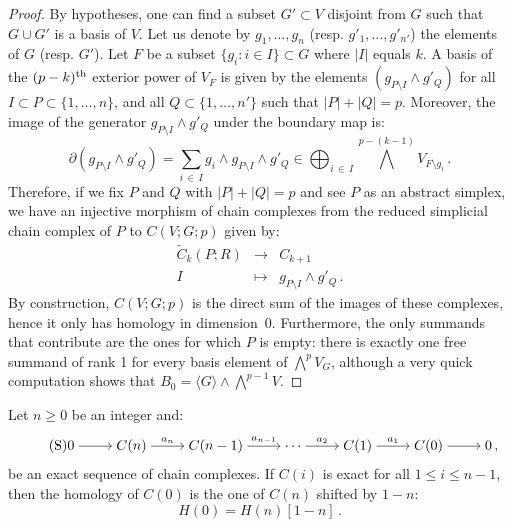 \documentclass[AHL,Unicode,longabstracts,published]{cedram}
\begin{document}
\begin{proof}
By hypotheses, one can find a subset $G'\subset V$ disjoint from $G$ such that $G\cup G'$ is a basis of $V$. Let us denote by $g_1,\dots,g_n$ (resp. $g'_1,\dots,g'_{n'}$) the elements of $G$ (resp. $G'$). Let $F$ be a subset $\{g_i:i\in I\}\subset G$ where $|I|$ equals $k$. A basis of the $(p-k)^{\rm th}$ exterior power of $V_F$ is given by the elements $(g_{P\setminus I}\wedge g'_Q)$ for all ${I\subset P\subset \{1,\dots,n\}}$, and all ${Q\subset \{1,\dots,n'\}}$ such that $|P|+|Q|=p$. Moreover, the image of the generator $g_{P\setminus I}\wedge g'_Q$ under the boundary map is:
\begin{equation*}
\partial (g_{P\setminus I}\wedge g'_Q) = \sum_{i\,\in\,I} g_i\wedge g_{P\setminus I}\wedge g'_Q \in \bigoplus_{i\,\in\,I}\bigwedge^{p-(k-1)} V_{F\setminus g_i}\,.
\end{equation*}
Therefore, if we fix $P$ and $Q$ with $|P|+|Q|=p$ and see $P$ as an abstract simplex, we have an injective morphism of chain complexes from the reduced simplicial chain complex of $P$ to $C(V;G;p)$ given by:
\begin{equation*}
\begin{array}{rcl}
\widetilde{C}_k(P;R) & \longrightarrow & C_{k+1}\\
I & \longmapsto & g_{P\setminus I}\wedge g'_Q\,.
\end{array}
\end{equation*}
By construction, $C(V;G;p)$ is the direct sum of the images of these complexes, hence it only has homology in dimension~0. Furthermore, the only summands that contribute are the ones for which $P$ is empty: there is exactly one free summand of rank 1 for every basis element of $\bigwedge^{p}V_G$, although a very quick computation shows that $B_0=\langle G\rangle \wedge \bigwedge^{p-1}V$.
\end{proof}

\begin{lemm}\label{lemm:hom_shi}
Let $n\geq 0$ be an integer and:
\begin{equation}\label{eq:hypo_hom_shi}
\tag{S}
\begin{tikzcd}[cramped]
0 \ar[r] & C(n) \ar[r,"a_n"] & C(n-1) \ar[r,"a_{n-1}"] & \cdots \ar[r,"a_2"] & C(1) \ar[r,"a_1"] & C(0) \ar[r] & 0\,,
\end{tikzcd}
\end{equation}
be an exact sequence of chain complexes. If $C(i)$ is exact for all $1 \leq i \leq n-1$, then the homology of $C(0)$ is the one of $C(n)$ shifted by $1-n$:
\begin{equation*}
H(0)=H(n)[1-n]\,.
\end{equation*}
\end{lemm}
\end{document}
